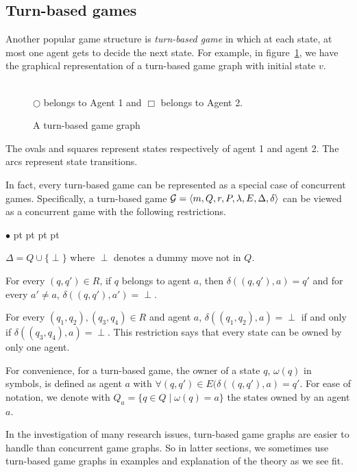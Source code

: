 \documentclass[11pt]{article}
\newcommand{\calg}{{\cal G}}
\newcommand{\pfrr}{\Box}
\newenvironment{list1}{\begin{list}{$\bullet$}
{\topsep 0 pt \parsep 0 pt \partopsep 0 pt \itemsep 0 pt}}{\end{list}}
\begin{document}
\subsection{Turn-based games} 

Another popular game structure is {\em turn-based game} 
in which at each state, at most one agent gets to decide the next state. 
For example, in figure~\ref{fig.tg}, we have the graphical representation of 
a turn-based game graph with initial state $v$.  
\begin{figure}[!ht]
\begin{center}
 \\
$\bigcirc$ belongs to Agent 1 and $\pfrr$ belongs to Agent 2.
\end{center}
\caption{A turn-based game graph}
\label{fig.tg}
\end{figure} 
The ovals and squares represent states respectively of 
agent 1 and agent 2. 
The arcs represent state transitions.  

In fact, every turn-based game can be represented as a special case of 
concurrent games.  
Specifically, a turn-based game 
$\calg=\langle m,Q,r,P,\lambda,E,\Delta,\delta\rangle$ 
can be viewed as a concurrent game with the following restrictions. 
\begin{list1} 
\item $\Delta=Q\cup\{\perp\}$ where $\perp$ denotes a dummy move not in $Q$. 
\item For every $(q,q')\in R$, if $q$ belongs to agent $a$, 
	then $\delta((q,q'),a)=q'$ and 
	for every $a'\neq a$, $\delta((q,q'),a')=\perp$. 
\item For every $(q_1,q_2),(q_3,q_4)\in R$ and agent $a$, 
	$\delta((q_1,q_2),a)=\perp$ if and only if $\delta((q_3,q_4),a)=\perp$.  
	This restriction says that every state can be owned by only one agent. 
\end{list1} 
For convenience, for a turn-based game, 
the owner of a state $q$, $\omega(q)$ in symbols, is defined as agent $a$ with 
$\forall (q,q')\in E(\delta((q,q'),a)=q'$.  
For ease of notation, we denote with 
$Q_a = \{q \in Q \mid \omega(q)=a\}$ 
the states owned by an agent $a$.

In the investigation of many research issues, 
turn-based game graphs are easier to handle than concurrent game graphs.   
So in latter sections, we sometimes use turn-based game graphs 
in examples and explanation of the theory as we see fit. 
\end{document}
